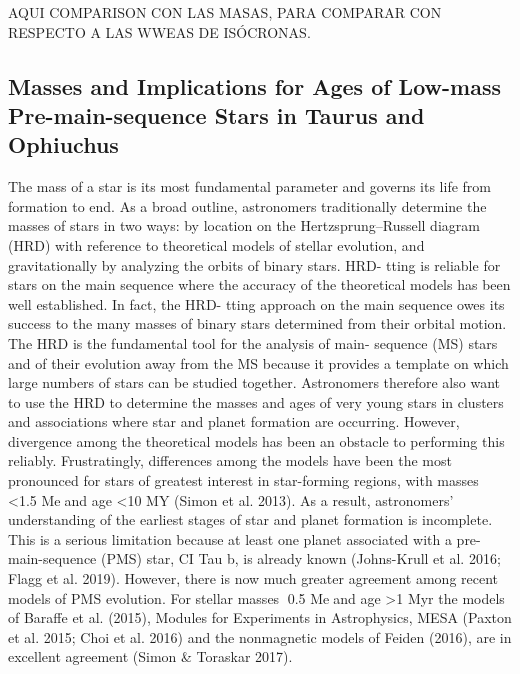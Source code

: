 \documentclass[../Main.tex]{subfiles}
\begin{document}
{AQUI COMPARISON CON LAS MASAS, PARA COMPARAR CON RESPECTO A LAS WWEAS DE ISÓCRONAS.

\subsection{Masses and Implications for Ages of Low-mass Pre-main-sequence Stars in Taurus and
Ophiuchus}

The mass of a star is its most fundamental parameter and
governs its life from formation to end. As a broad outline,
astronomers traditionally determine the masses of stars in two
ways: by location on the Hertzsprung–Russell diagram (HRD)
with reference to theoretical models of stellar evolution, and
gravitationally by analyzing the orbits of binary stars. HRD-
tting is reliable for stars on the main sequence where the
accuracy of the theoretical models has been well established. In
fact, the HRD- tting approach on the main sequence owes its
success to the many masses of binary stars determined from
their orbital motion.
The HRD is the fundamental tool for the analysis of main-
sequence (MS) stars and of their evolution away from the MS
because it provides a template on which large numbers of stars
can be studied together. Astronomers therefore also want to use
the HRD to determine the masses and ages of very young stars
in clusters and associations where star and planet formation are
occurring. However, divergence among the theoretical models
has been an obstacle to performing this reliably. Frustratingly,
differences among the models have been the most pronounced
for stars of greatest interest in star-forming regions, with
masses <1.5 Meand age <10 MY (Simon et al. 2013). As a
result, astronomers’ understanding of the earliest stages of star
and planet formation is incomplete. This is a serious limitation
because at least one planet associated with a pre-main-sequence
(PMS) star, CI Tau b, is already known (Johns-Krull et al. 2016;
Flagg et al. 2019). However, there is now much greater agreement
among recent models of PMS evolution. For stellar masses
0.5 Meand age >1 Myr the models of Baraffe et al. (2015),
Modules for Experiments in Astrophysics, MESA (Paxton et al.
2015; Choi et al. 2016) and the nonmagnetic models of Feiden
(2016), are in excellent agreement (Simon & Toraskar 2017).

}
\end{document}
